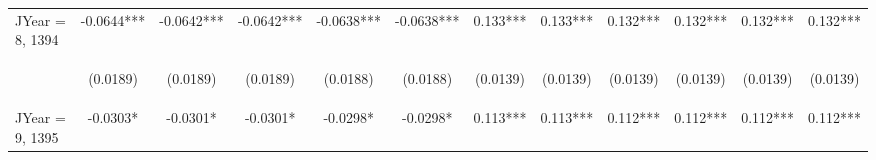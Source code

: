 \documentclass[]{article}
\begin{document}
\begin{center}
\begin{tabular}{lccccccccccc}
JYear = 8, 1394 & -0.0644*** & -0.0642*** & -0.0642*** & -0.0638*** & -0.0638*** & 0.133*** & 0.133*** & 0.132*** & 0.132*** & 0.132*** & 0.132*** \\
\vspace{4pt} & \begin{footnotesize}(0.0189)\end{footnotesize} & \begin{footnotesize}(0.0189)\end{footnotesize} & \begin{footnotesize}(0.0189)\end{footnotesize} & \begin{footnotesize}(0.0188)\end{footnotesize} & \begin{footnotesize}(0.0188)\end{footnotesize} & \begin{footnotesize}(0.0139)\end{footnotesize} & \begin{footnotesize}(0.0139)\end{footnotesize} & \begin{footnotesize}(0.0139)\end{footnotesize} & \begin{footnotesize}(0.0139)\end{footnotesize} & \begin{footnotesize}(0.0139)\end{footnotesize} & \begin{footnotesize}(0.0139)\end{footnotesize} \\
JYear = 9, 1395 & -0.0303* & -0.0301* & -0.0301* & -0.0298* & -0.0298* & 0.113*** & 0.113*** & 0.112*** & 0.112*** & 0.112*** & 0.112*** \\

\end{tabular}
\end{center}
\end{document}
